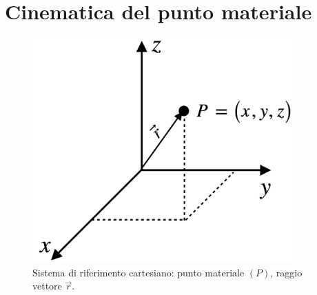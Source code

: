 \chapter{Cinematica del punto materiale}
\begin{figure}[htbp]
\begin{center}
\includegraphics[width=10cm]{images/assi.png} 
\caption{Sistema di riferimento cartesiano: punto materiale $(P)$, raggio vettore $\vec r$.}
\label{default}
\end{center}
\end{figure}

